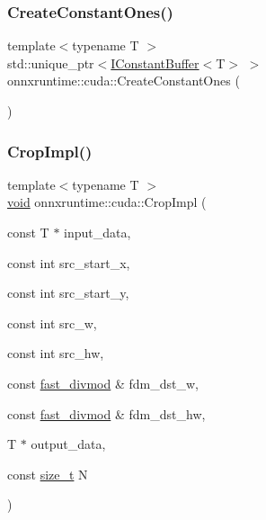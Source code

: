 \mbox{\label{namespaceonnxruntime_1_1cuda_a855114def2d3cfc9e8f0ff2d267ff782}} 
\subsubsection{\texorpdfstring{Create\+Constant\+Ones()}{CreateConstantOnes()}}
{\footnotesize\ttfamily template$<$typename T $>$ \\
std\+::unique\+\_\+ptr$<$\mbox{\hyperlink{classonnxruntime_1_1cuda_1_1IConstantBuffer}{I\+Constant\+Buffer}}$<$T$>$ $>$ onnxruntime\+::cuda\+::\+Create\+Constant\+Ones (\begin{DoxyParamCaption}{ }\end{DoxyParamCaption})}

\mbox{\label{namespaceonnxruntime_1_1cuda_a3329fe7e028acb06f43ca214ea317902}} 
\subsubsection{\texorpdfstring{Crop\+Impl()}{CropImpl()}}
{\footnotesize\ttfamily template$<$typename T $>$ \\
\mbox{\hyperlink{mlasi_8h_a88f941d423cb2a819b70a1358982b1a6}{void}} onnxruntime\+::cuda\+::\+Crop\+Impl (\begin{DoxyParamCaption}\item[{const T $\ast$}]{input\+\_\+data,  }\item[{const int}]{src\+\_\+start\+\_\+x,  }\item[{const int}]{src\+\_\+start\+\_\+y,  }\item[{const int}]{src\+\_\+w,  }\item[{const int}]{src\+\_\+hw,  }\item[{const \mbox{\hyperlink{classonnxruntime_1_1cuda_1_1fast__divmod}{fast\+\_\+divmod}} \&}]{fdm\+\_\+dst\+\_\+w,  }\item[{const \mbox{\hyperlink{classonnxruntime_1_1cuda_1_1fast__divmod}{fast\+\_\+divmod}} \&}]{fdm\+\_\+dst\+\_\+hw,  }\item[{T $\ast$}]{output\+\_\+data,  }\item[{const \mbox{\hyperlink{mlasi_8h_a503efbc1c6e50825320ad909366b78ab}{size\+\_\+t}}}]{N }\end{DoxyParamCaption})}

